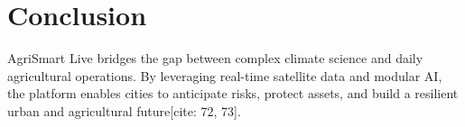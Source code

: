 \documentclass[11pt]{article}
\begin{document}
\section{Conclusion}
AgriSmart Live bridges the gap between complex climate science and daily agricultural operations. By leveraging real-time satellite data and modular AI, the platform enables cities to anticipate risks, protect assets, and build a resilient urban and agricultural future[cite: 72, 73].
\end{document}
